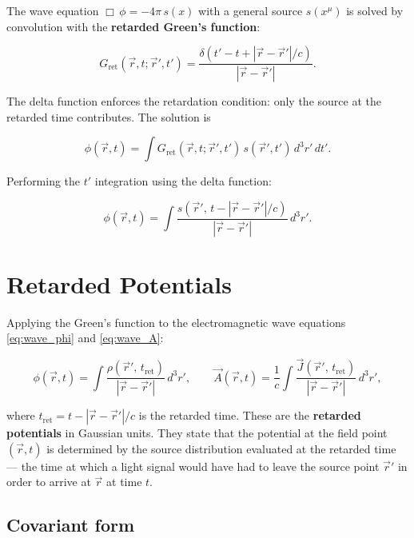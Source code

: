 The wave equation $\Box\,\phi = -4\pi\,s(x)$ with a general source $s(x^\mu)$ is solved by convolution with the \textbf{retarded Green's function}:

\begin{equation}
G_{\text{ret}}(\vec{r},t;\vec{r}',t') = \frac{\delta(t' - t + |\vec{r}-\vec{r}'|/c)}{|\vec{r}-\vec{r}'|}.
\end{equation}

The delta function enforces the retardation condition: only the source at the retarded time contributes. The solution is

\begin{equation}
\phi(\vec{r},t) = \int G_{\text{ret}}(\vec{r},t;\vec{r}',t')\,s(\vec{r}',t')\,d^3r'\,dt'.
\end{equation}

Performing the $t'$ integration using the delta function:

\begin{equation}
\phi(\vec{r},t) = \int \frac{s(\vec{r}',\,t - |\vec{r}-\vec{r}'|/c)}{|\vec{r}-\vec{r}'|}\,d^3r'.
\end{equation}

\section{Retarded Potentials}

Applying the Green's function to the electromagnetic wave equations \eqref{eq:wave_phi} and \eqref{eq:wave_A}:

\begin{equation}
\boxed{\phi(\vec{r},t) = \int \frac{\rho(\vec{r}',\,t_{\text{ret}})}{|\vec{r}-\vec{r}'|}\,d^3r', \qquad \vec{A}(\vec{r},t) = \frac{1}{c}\int \frac{\vec{J}(\vec{r}',\,t_{\text{ret}})}{|\vec{r}-\vec{r}'|}\,d^3r',}
\end{equation}

where $t_{\text{ret}} = t - |\vec{r}-\vec{r}'|/c$ is the retarded time. These are the \textbf{retarded potentials} in Gaussian units. They state that the potential at the field point $(\vec{r}, t)$ is determined by the source distribution evaluated at the retarded time --- the time at which a light signal would have had to leave the source point $\vec{r}'$ in order to arrive at $\vec{r}$ at time $t$.

\subsection{Covariant form}

